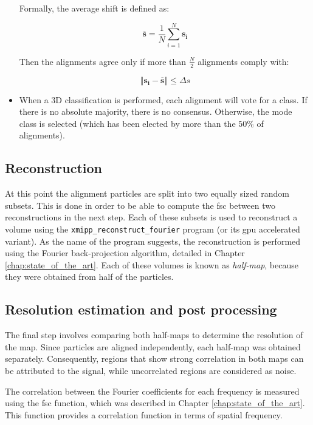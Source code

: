\documentclass[../main.tex]{subfiles}
\begin{document}
\begin{itemize}
    Formally, the average shift is defined as:

    \begin{equation}
        \overline{\bm{s}} = \frac{1}{N} \sum_{i=1}^{N} \bm{s_i}
    \end{equation}

    Then the alignments agree only if more than $\frac{N}{2}$ alignments comply with:

    \begin{equation}
        \left\Vert \bm{s_i} - \overline{\bm{s}}  \right\Vert \leq \Delta s
    \end{equation}

    \item When a 3D classification is performed, each alignment will vote for a class. If there is no absolute majority, there is no consensus. Otherwise, the mode class is selected (which has been elected by more than the $50 \si{\percent}$ of alignments).
    
\end{itemize}

\subsection{Reconstruction}
At this point the alignment particles are split into two equally sized random subsets. This is done in order to be able to compute the \gls{fsc} between two reconstructions in the next step. Each of these subsets is used to reconstruct a volume using the \texttt{xmipp\_reconstruct\_fourier} program (or its \gls{gpu} accelerated variant). As the name of the program suggests, the reconstruction is performed using the Fourier back-projection algorithm, detailed in Chapter \ref{chap:state_of_the_art}. Each of these volumes is known as \textit{half-map}, because they were obtained from half of the particles.

\subsection{Resolution estimation and post processing}
The final step involves comparing both half-maps to determine the resolution of the map. Since particles are aligned independently, each half-map was obtained separately. Consequently, regions that show strong correlation in both maps can be attributed to the signal, while uncorrelated regions are considered as noise.

The correlation between the Fourier coefficients for each frequency is measured using the \gls{fsc} function, which was described in Chapter \ref{chap:state_of_the_art}. This function provides a correlation function in terms of spatial frequency.
\end{document}
